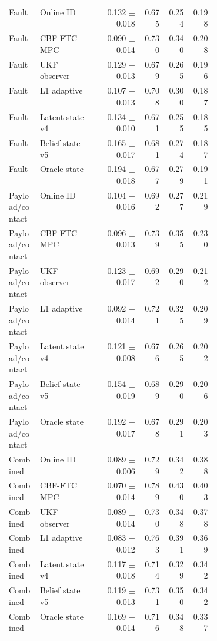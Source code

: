 \documentclass{article}
\begin{document}
\begin{center}
\begin{longtable}{p{0.15\linewidth}p{0.26\linewidth}rrrr}
Fault & Online ID & 0.132 $\pm$ 0.018 & 0.675 & 0.254 & 0.198\\
Fault & CBF-FTC MPC & 0.090 $\pm$ 0.014 & 0.730 & 0.340 & 0.208\\
Fault & UKF observer & 0.129 $\pm$ 0.013 & 0.679 & 0.265 & 0.196\\
Fault & L1 adaptive & 0.107 $\pm$ 0.013 & 0.708 & 0.300 & 0.187\\
Fault & Latent state v4 & 0.134 $\pm$ 0.010 & 0.671 & 0.255 & 0.185\\
Fault & Belief state v5 & 0.165 $\pm$ 0.017 & 0.681 & 0.274 & 0.187\\
Fault & Oracle state & 0.194 $\pm$ 0.018 & 0.677 & 0.279 & 0.191\\
Payload/contact & Online ID & 0.104 $\pm$ 0.016 & 0.692 & 0.277 & 0.219\\
Payload/contact & CBF-FTC MPC & 0.096 $\pm$ 0.013 & 0.739 & 0.355 & 0.230\\
Payload/contact & UKF observer & 0.123 $\pm$ 0.017 & 0.692 & 0.290 & 0.212\\
Payload/contact & L1 adaptive & 0.092 $\pm$ 0.014 & 0.721 & 0.325 & 0.209\\
Payload/contact & Latent state v4 & 0.121 $\pm$ 0.008 & 0.676 & 0.265 & 0.202\\
Payload/contact & Belief state v5 & 0.154 $\pm$ 0.019 & 0.689 & 0.290 & 0.206\\
Payload/contact & Oracle state & 0.192 $\pm$ 0.017 & 0.678 & 0.291 & 0.203\\
Combined & Online ID & 0.089 $\pm$ 0.006 & 0.729 & 0.342 & 0.388\\
Combined & CBF-FTC MPC & 0.070 $\pm$ 0.014 & 0.789 & 0.430 & 0.403\\
Combined & UKF observer & 0.089 $\pm$ 0.014 & 0.730 & 0.348 & 0.378\\
Combined & L1 adaptive & 0.083 $\pm$ 0.012 & 0.763 & 0.391 & 0.369\\
Combined & Latent state v4 & 0.117 $\pm$ 0.018 & 0.714 & 0.329 & 0.342\\
Combined & Belief state v5 & 0.119 $\pm$ 0.013 & 0.731 & 0.350 & 0.342\\
Combined & Oracle state & 0.169 $\pm$ 0.014 & 0.716 & 0.348 & 0.337\\
\bottomrule
\end{longtable}
\normalsize
\end{center}
\end{document}
